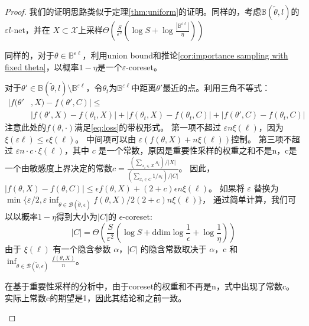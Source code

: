 \begin{proof}
    我们的证明思路类似于定理\ref{thm:uniform}的证明。同样的，考虑$\mathbb{B}(\tilde{\theta},l)$的$\varepsilon l$-net，并在
    $X\subset \mathcal{X}$上采样$\Theta\left(\frac{S}{\varepsilon^2}\left(\log S +\log \frac {\left|\mathbb{B}^{\varepsilon \ell}\right|} {\eta} \right)\right)$

    同样的，对于$\theta \in \mathbb{B}^{\varepsilon \ell}$，利用union bound和推论\ref{cor:importance sampling with fixed theta}，以概率$1-\eta$是一个$\varepsilon$-coreset。

    对于$\theta' \in \mathbb{B}(\tilde{\theta},l)\setminus \mathbb{B}^{\varepsilon \ell}$，令$\theta_t$为$\mathbb{B}^{\varepsilon \ell}$中距离$\theta'$最近的点。利用三角不等式：
    \begin{align*}
        |f(\theta'&,X)-f(\theta',C)|\leq \\
        &|f(\theta',X)-f(\theta_t,X)|+|f(\theta_t,X)-f(\theta_t,C)|+|f(\theta',C)-f(\theta_t,C)|
    \end{align*}
    注意此处的$f(\theta,\cdot)$满足\ref{eq:loss}的带权形式。
    第一项不超过 $\varepsilon n \xi(\ell)$，因为 $\xi(\varepsilon \ell) \leq \epsilon \xi(\ell)$。
    中间项可以由 $\varepsilon (f(\theta, X) + n \xi(\ell))$控制。
    第三项不超过 $\varepsilon n \cdot c \cdot \xi(\ell)$，其中 $c$ 是一个常数，原因是重要性采样的权重之和不是n，c是一个由敏感度上界决定的常数$c=\frac{(\sum_{x_i\in X}s_i)/|X|}{(\sum_{x_i \in C}1/s_i)/|C|}$。
    因此，$|f(\theta, X) - f(\theta, C)| \leq \epsilon f(\theta, X) + (2+c) \epsilon n \xi(\ell)$。
    如果将 $\varepsilon$ 替换为 $\min \{\varepsilon / 2, \varepsilon \inf_{\theta \in \mathcal{B}(\tilde{\theta}, \epsilon)} f(\theta, X) / 2(2+c)n \xi(\ell)\}$，
    通过简单计算，我们可以以概率$1-\eta$得到大小为$|C|$的 $\epsilon$-coreset:
\begin{equation}
|C| = \Theta \left( \frac{S}{\varepsilon^2} \left( \log S+\text{ddim} \log \frac{1}{\epsilon} + \log \frac{1}{\eta} \right) \right)
\end{equation}
由于 $\xi(\ell)$ 有一个隐含参数 $\alpha$，$|C|$ 
的隐含常数取决于 $\alpha$，c 和
$\inf_{\theta \in \mathcal{B}(\tilde{\theta}, \epsilon)} \frac{f(\theta, X)}{n}$。
\begin{remark}
    在基于重要性采样的分析中，由于coreset的权重和不再是n，式中出现了常数c。实际上常数c的期望是1，因此其结论和之前一致。
\end{remark}

\end{proof}

